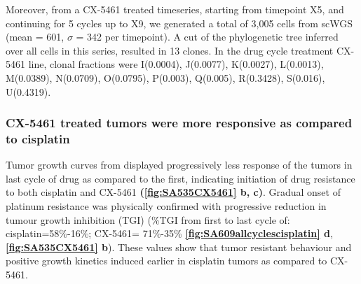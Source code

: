 Moreover, from a CX-5461 treated timeseries, starting from timepoint X5, and continuing for 5 cycles up to X9, we generated a total of 3,005 cells from scWGS (mean = 601, $\sigma$ = 342 per timepoint). A cut of the phylogenetic tree inferred over all cells in this series, resulted in 13 clones. In the drug cycle treatment CX-5461 line, clonal fractions were I(0.0004), J(0.0077), K(0.0027), L(0.0013), M(0.0389), N(0.0709), O(0.0795), P(0.003), Q(0.005), R(0.3428), S(0.016), U(0.4319).


\subsubsection{CX-5461 treated tumors were more responsive as compared to cisplatin}
Tumor growth curves from displayed progressively less response of the tumors in last cycle of drug as compared to the first, indicating initiation of drug resistance to both cisplatin and CX-5461 \textbf{(\autoref{fig:SA535CX5461} b, c)}. 
Gradual onset of platinum resistance was physically confirmed with progressive reduction in tumour growth inhibition (TGI) (\%TGI from first to last cycle of: cisplatin=58\%-16\%; CX-5461= 71\%-35\% \textbf{\autoref{fig:SA609allcyclescisplatin} d}, \textbf{\autoref{fig:SA535CX5461} b}). 
These values show that tumor resistant behaviour and positive growth kinetics induced earlier in cisplatin tumors as compared to CX-5461. 


